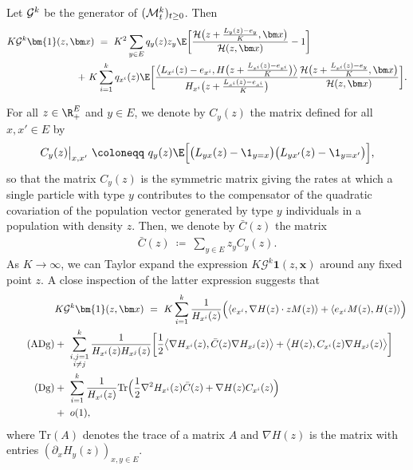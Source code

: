 \begin{refsegment}
\begin{lem}\label{lem:generator_applied_to_1}
Let ${\cal G}^k$ be the generator of $({\cal M}^{k}_t)_{t\geq0}$. Then 
\begin{align*} 
K\mathcal{G}^k\bm{1}(z,\bm x)\ &=\  K^2\sum_{y\in E}q_{y}(z) z_y  \E\bigg[\frac{ \mathcal{H}\big(z+ \frac{L_y(z) -e_{y}}{K},\bm x\big)}{\mathcal{H}(z, \bm x ) } - 1\bigg] \\\ 
+\   K &\sum_{i=1}^k  q_{x^i}(z)\E\bigg[\frac{\big\langle L_{x^i}(z) -e_{x^i}, H\big(z+ \frac{L_{x^i}(z) -e_{x^i}}{K} \big)\big\rangle}{H_{x^i}\big(z+ \frac{L_{x^i}(z) -e_{x^i}}{K}\big)}\frac{ \mathcal{H}\big(z+ \frac{L_{x^i}(z) -e_{y}}{K},\bm x\big)}{\mathcal{H}(z, \bm x ) } \bigg].
\end{align*}
\end{lem}
For all $z\in \R_+^E$ and $y\in E$, we denote by $C_y(z)$ the matrix defined for all $x,x'\in E$ by
\begin{equation}\label{Ch4:eq:def_Sigma_covariance}
 C_y(z)\big|_{x,x'}\ \coloneqq\ q_y(z)\E\Big[\big(L_{yx}(z)-\1_{y=x}\big)\big(L_{yx'}(z)-\1_{y=x'}\big)\Big],
\end{equation}
so that the matrix $C_y(z)$ is the symmetric matrix giving the rates at which a single particle with type $y$ contributes to the compensator of the quadratic covariation of the population vector generated by type $y$ individuals in a population with density $z$. Then, we denote by $\bar{C}(z)$ the matrix
\begin{eqnarray*}
\bar{C}(z)\ \coloneqq\ \sum_{y \in E} z_y C_y(z).
\end{eqnarray*}
As $K\to\infty$, we can Taylor expand the expression $K\mathcal{G}^k\bm{1}(z,\bm x)$
around any fixed point $z$. A close inspection of the latter expression suggests that 
\begin{align*}
&K\mathcal{G}^k\bm{1}(z,\bm x)\ =\  K\sum_{i=1}^k\frac{1}{H_{x^i}(z)}\Big(\langle e_{x^i},\nabla H(z)\cdot zM(z)\rangle + \langle e_{x^i}M(z), H(z)\rangle\Big)  \\\label{Ch4:eq:term_antidiag}\tag{$\mathrm{ADg}$}
 & +\ 
\sum_{\substack{i,j=1 \\ i\neq j}}^k\frac{1}{H_{x^i}(z)H_{x^j}(z)} \bigg[ \frac{1}{2}  \big\langle \nabla H_{x^i}(z) ,\bar C(z) \nabla H_{x^j}(z)\big\rangle 
+ \big\langle H(z), C_{x^i}(z) \nabla H_{x^j}(z)\big\rangle \bigg]
\\\label{Ch4:eq:term_diag}\tag{$\mathrm{Dg}$} &
+\ \sum_{i=1}^k\frac{1}{H_{x^i}(z)}\mathrm{Tr}\Big(
  \frac{1}{2} \nabla^2 H_{x^i}(z) \bar C(z)
  +  \nabla H(z)  C_{x^i}(z)\Big)\\
  &+\  o(1),
\end{align*}
where $\mathrm{Tr}(A)$ denotes the trace of a matrix $A$ and $\nabla H(z)$ is the matrix with entries $(\partial_x H_y(z))_{x,y\in E}$.


\end{refsegment}
